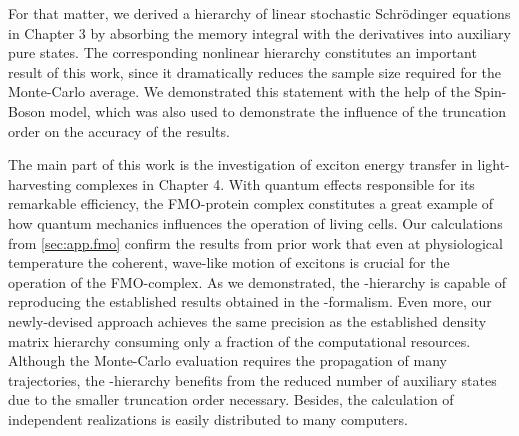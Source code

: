 
For that matter, we derived a hierarchy of linear stochastic Schrödinger equations in Chapter 3 by absorbing the memory integral with the derivatives into auxiliary pure states.
The corresponding nonlinear hierarchy constitutes an important result of this work, since it dramatically reduces the sample size required for the Monte-Carlo average.
We demonstrated this statement with the help of the Spin-Boson model, which was also used to demonstrate the influence of the truncation order on the accuracy of the results.


The main part of this work is the investigation of exciton energy transfer in light-harvesting complexes in Chapter 4.
With quantum effects responsible for its remarkable efficiency, the \textsc{FMO}-protein complex constitutes a great example of how quantum mechanics influences the operation of living cells.
Our calculations from \autoref{sec:app.fmo} confirm the results from prior work that even at physiological temperature the coherent, wave-like motion of excitons is crucial for the operation of the \textsc{FMO}-complex.
As we demonstrated, the \NMSSE-hierarchy is capable of reproducing the established results obtained in the \HEOM-formalism.
Even more, our newly-devised approach achieves the same precision as the established density matrix hierarchy consuming only a fraction of the computational resources.
Although the Monte-Carlo evaluation requires the propagation of many trajectories, the \NMSSE-hierarchy benefits from the reduced number of auxiliary states due to the smaller truncation order necessary.
Besides, the calculation of independent realizations is easily distributed to many computers.

